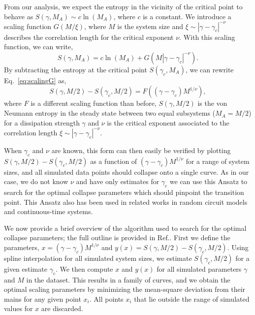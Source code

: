 From our analysis, we expect the entropy in the vicinity of the critical point to behave as $S(\gamma,M_A) \sim c \ln(M_A)$, where $c$ is a constant. We introduce a scaling function $G(M/\xi)$, where $M$ is the system size and $\xi \sim |\gamma - \gamma_c|^{-\nu}$ describes the correlation length for the critical exponent $\nu$. With this scaling function, we can write, 
\begin{equation}
\label{eq:scalingG}
    S(\gamma,M_A) = c \ln(M_A) + G(M |\gamma - \gamma_c|^{-\nu}).
\end{equation}
By subtracting the entropy at the critical point $S(\gamma_c, M_A)$, we can rewrite Eq.~\ref{eq:scalingG} as,
\begin{equation}
    S(\gamma,M/2) - S(\gamma_c,M/2) = F((\gamma - \gamma_c) M^{1/\nu}), 
\end{equation}
where $F$ is a different scaling function than before, $S(\gamma,M/2)$ is the von Neumann entropy in the steady state between two equal subsystems ($M_A = M/2$) for a dissipation strength $\gamma$ and $\nu$ is the critical exponent associated to the correlation length $\xi \sim |\gamma - \gamma_c|^{-\nu}$.

When $\gamma_c$ and $\nu$ are known, this form can then easily be verified by plotting $S(\gamma,M/2) - S(\gamma_c,M/2)$ as a function of $(\gamma - \gamma_c) M^{1/\nu}$ for a range of system sizes, and all simulated data points should collapse onto a single curve. As in our case, we do not know $\nu$ and have only estimates for $\gamma_c$ we can use this Ansatz to search for the optimal collapse parameters which should pinpoint the transition point. This Ansatz also has been used in related works \cite{skinner2019, fuji2020, li2019} in random circuit models and continuous-time systems.

We now provide a brief overview of the algorithm used to search for the optimal collapse parameters; the full outline is provided in Ref.\cite{skinner2019}. First we define the parameters, $x = (\gamma - \gamma_c) M^{1/\nu}$ and $y(x) = S(\gamma,M/2) - S(\gamma_c,M/2)$. Using spline interpolation for all simulated system sizes, we estimate $S(\gamma_c,M/2)$ for a given estimate $\gamma_c$. We then compute $x$ and $y(x)$ for all simulated parameters $\gamma$ and $M$ in the dataset. This results in a family of curves, and we obtain the optimal scaling parameters by minimizing the mean-square deviation from their mains for any given point $x_i$. All points $x_i$ that lie outside the range of simulated values for $x$ are discarded.

